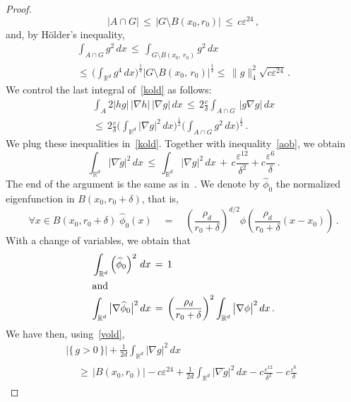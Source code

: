 \documentclass[AHL, Unicode, longabstracts, published]{cedram}
\newcommand*\Rd {{\mathbb R^d}}
\newcommand*\hp{{\widehat \phi}}
\newcommand*\gt{\widetilde g}
\let\oldforall\forall
\renewcommand*{\forall}{\mathrel{\oldforall}}
\begin{document}
\begin{proof}
\begin{equation}\label{vold}
\big|A\cap G\big|
\,\leq\,
\big|G\setminus B(x_0,r_0)\big|
\,\leq\, c\varepsilon^{24}
\,,
\end{equation}
and, by H\"older's inequality,
\begin{multline}\label{hold}
\int_{A\cap G}g^2\,dx\,\leq\,
\int_{G\setminus B(x_0,\,r_0)}g^2\,dx\,
\\
\leq\,\Big(
\int_{\Rd}g^4\,dx
\Big)^{\frac{1}{2}}
\big|G\setminus B(x_0,\,r_0)\big| ^{\frac{1}{2}}
\leq\, \|g\|_4^2
\sqrt{c\varepsilon^{24}}\,.
\end{multline}
We control the last integral of~\eqref{kold} as follows:
\begin{multline}\label{last}
\int_{A}2 |hg| \,
\big|\nabla h\big|\,
\big|\nabla g\big|\,dx
\,\leq\, 2\frac{c}{\delta}
\int_{A\cap G} \,
\big|g\nabla g\big|\,dx
\\
\leq\, 2\frac{c}{\delta}
\Big(\int_{\Rd}\big|\nabla g\big|^2\,dx\Big)^{\frac{1}{2}}
\Big(\int_{A\cap G}g^2\,dx\Big)^{\frac{1}{2}}
\,.
\end{multline}
We plug these inequalities in~\eqref{kold}. Together with inequality~\eqref{aob}, we obtain
\begin{equation}
\int_{\Rd}\big|\nabla \gt\big|^2\,dx\,\leq\,
\int_{\Rd}\big|\nabla g\big|^2\,dx\,+\, c
\frac{\varepsilon^{12}}{\delta^2}+ c
\frac{\varepsilon^{6}}{\delta}\,.
\end{equation}
The end of the argument is the same as in~\cite[Lemma~$A.1$]{BO}. We denote by $\hp_0$ the normalized eigenfunction in $B(x_0,r_0+\delta)$, that is,
\[
\forall x\in
B(x_0,r_0+\delta)\;
\hp_0(x)\quad=\quad
\left(\frac{\rho_d}{r_0+\delta}\right)^{d/2}
\phi\left(
\frac{\rho_d}{r_0+\delta}(x-x_0)\right)\,.
\]
With a change of variables, we obtain that
\begin{align*}
\int_{\Rd}\left(\hp_0\right)^2\,dx\,&=\,1\\
\intertext{and}
\int_{\Rd}\big|\nabla \hp_0\big|^2\,dx\,&=\,
\left(\frac{\rho_d}{r_0+\delta}\right)^{2}
\int_{\Rd}\big|\nabla \phi\big|^2\,dx\,.
\end{align*}
We have then, using~\eqref{vold},
\begin{multline}\label{glob}
\big|\{\,g>0\,\}\big| +
\frac{1}{2d}
\int_{\Rd}\big|\nabla g\big|^2\,dx\\
\begin{aligned}
&\geq\,\big|B(x_0,r_0)\big|- c\varepsilon^{24} +\frac{1}{2d}
\int_{\Rd}\big|\nabla \gt\big|^2\,dx -c
\frac{\varepsilon^{12}}{\delta^2}- c
\frac{\varepsilon^{6}}{\delta}

\end{aligned}
\end{multline}
\end{proof}
\end{document}
